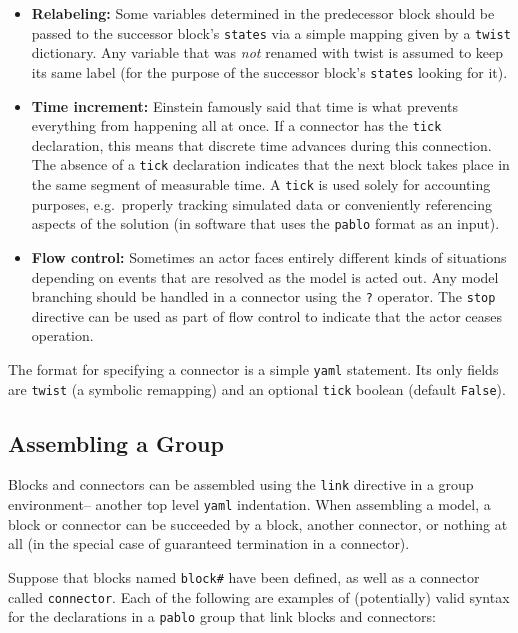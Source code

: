 \documentclass[12pt,pdftex,letterpaper]{article}
\begin{document}
\begin{itemize}
	\item \textbf{Relabeling:} Some variables determined in the predecessor block should be passed to the successor block's \texttt{states} via a simple mapping given by a \texttt{twist} dictionary. Any variable that was \textit{not} renamed with twist is assumed to keep its same label (for the purpose of the successor block's \texttt{states} looking for it).
	
	\item \textbf{Time increment:} Einstein famously said that time is what prevents everything from happening all at once. If a connector has the \texttt{tick} declaration, this means that discrete time advances during this connection. The absence of a \texttt{tick} declaration indicates that the next block takes place in the same segment of measurable time. A \texttt{tick} is used solely for accounting purposes, e.g.\ properly tracking simulated data or conveniently referencing aspects of the solution (in software that uses the \texttt{pablo} format as an input).
	
	\item \textbf{Flow control:} Sometimes an actor faces entirely different kinds of situations depending on events that are resolved as the model is acted out. Any model branching should be handled in a connector using the \texttt{?} operator. The \texttt{stop} directive can be used as part of flow control to indicate that the actor ceases operation.
\end{itemize}

The format for specifying a connector is a simple \texttt{yaml} statement. Its only fields are \texttt{twist} (a symbolic remapping) and an optional \texttt{tick} boolean (default \texttt{False}).


\subsection{Assembling a Group}

Blocks and connectors can be assembled using the \texttt{link} directive in a group environment-- another top level \texttt{yaml} indentation. When assembling a model, a block or connector can be succeeded by a block, another connector, or nothing at all (in the special case of guaranteed termination in a connector).

Suppose that blocks named \texttt{block\#} have been defined, as well as a connector called \texttt{connector}. Each of the following are examples of (potentially) valid syntax for the declarations in a \texttt{pablo} group that link blocks and connectors:
\end{document}
